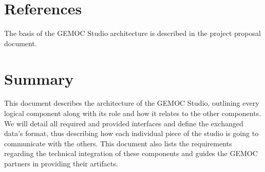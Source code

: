 \documentclass{gemoc} %
\begin{document}
\section{References}
The basis of the GEMOC Studio architecture is described in the project proposal document. 

\section{Summary}
This document describes the architecture of the GEMOC Studio, outlining every logical component along with its role and how it relates to the other components. We will detail all required and provided interfaces and define the exchanged data's format, thus describing how each individual piece of the studio is going to communicate with the others.
This document also lists the requirements regarding the technical integration of these components and guides the GEMOC partners in providing their artifacts.


 
\end{document}
